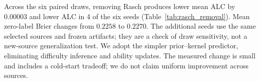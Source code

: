 Across the six paired draws, removing Rasch produces lower mean ALC by $0.00003$ and lower ALC in 4 of the six seeds (Table~\ref{tab:rasch_removal}). Mean zero-label Brier changes from $0.2258$ to $0.2270$. The additional seeds use the same selected sources and frozen artifacts; they are a check of draw sensitivity, not a new-source generalization test. We adopt the simpler prior--kernel predictor, eliminating difficulty inference and ability updates. The measured change is small and includes a cold-start tradeoff; we do not claim uniform improvement across sources.
